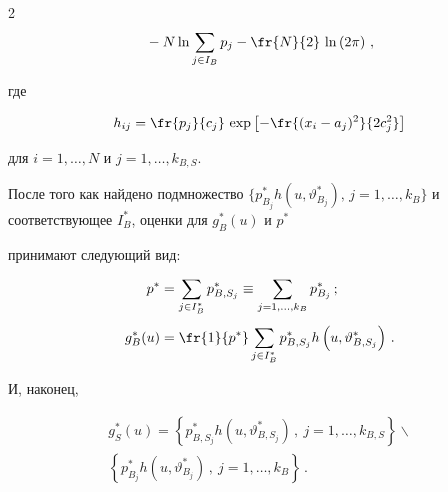 \begin{multicols}{2}
\begin{multline}
    {}-N\ln 


\sum\limits_{j\in I_B} p_j -\fr{N}{2}\,\ln\left (2\pi\right )\,,


     \label{e12kr}


     \end{multline}


где 


$$


h_{ij} = \fr{p_j}{c_j}\,\exp \left [ -\fr{(x_i-a_j)^2}{2c_j^2}\right ]


$$


для $i=1,\ldots ,N$ и $j=1,\ldots ,k_{B,S}$.


     


     После того как найдено подмножество $\{ p_{B_j}^* h(u,\vartheta_{B_j}^*),\, 


j=1,\ldots ,k_B\}$ и соответствующее $I_B^*$, оценки для $g_B^*(u)$ и $p^*$ 


принимают следующий вид:


     \begin{align}


     p^* & = \sum\limits_{j\in I_B^*} p_{B,S_j}^*\equiv \sum\limits_{j=1,\ldots , 


k_B} p_{B_j}^*\,;\notag\\[-6pt]


     &\label{e13kr}\\[-6pt]


     g_B^*(u) & = \fr{1}{p^*}\sum\limits_{j\in I_B^*}  p_{B,S_j}^* h\left ( u, 


\vartheta_{B,S_j}^* \right)\,.\notag


     \end{align}


     И, наконец, 


     \begin{multline}


     g_S^*(u) = \left \{ p_{B,S_j}^* h\left ( u,\vartheta_{B,S_j}^*\right )\,, \ j=1,\ldots ,k_{B,S}\right \} 


\backslash\\


\left  \{p_{B_j}^* h\left ( u, \vartheta_{B_j}^*\right )\,,\  j=1,\ldots ,k_B\right \}\,.


     \label{e14kr}


     \end{multline}






\end{multicols}
